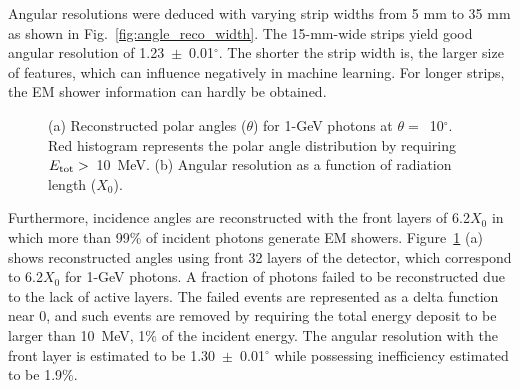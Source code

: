 \documentclass[preprint,12pt,times,a4paper]{elsarticle}
\begin{document}
Angular resolutions were deduced with varying strip widths from 5 mm to 35 mm as shown in Fig.~\ref{fig:angle_reco_width}. The 15-mm-wide strips yield good angular resolution of 1.23~$\pm$~0.01$^{\circ}$. The shorter the strip width is, the larger size of features, which can influence negatively in machine learning. For longer strips, the EM shower information can hardly be obtained.

\begin{figure}[!hbt]
\centering
{}
\caption{ (a) Reconstructed polar angles ($\theta$) for 1-GeV photons at $\theta=$~10$^{\circ}$. Red histogram represents the polar angle distribution by requiring $E_{\rm{tot}}>$~10~MeV. (b) Angular resolution as a function of radiation length ($X_{0}$).}
\label{fig:angle_reco_layer}
\end{figure}

Furthermore, incidence angles are reconstructed with the front layers of 6.2$X_{0}$ in which more than 99\% of incident photons generate EM showers. Figure~\ref{fig:angle_reco_layer} (a) shows reconstructed angles using front 32 layers of the detector, which correspond to 6.2$X_{0}$ for 1-GeV photons. A fraction of photons failed to be reconstructed due to the lack of active layers. The failed events are represented as a delta function near 0, and such events are removed by requiring the total energy deposit to be larger than 10~MeV, 1\% of the incident energy. The angular resolution with the front layer is estimated to be 1.30~$\pm$~0.01$^{\circ}$ while possessing inefficiency estimated to be 1.9\%.
\end{document}
